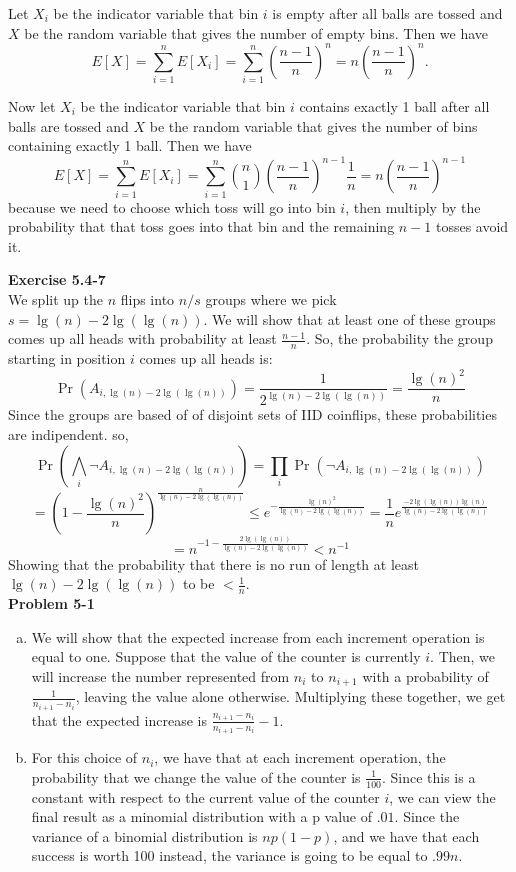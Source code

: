 \documentclass{article}
\begin{document}
Let $X_i$ be the indicator variable that bin $i$ is empty after all balls are tossed and $X$ be the random variable that gives the number of empty bins.  Then we have
\[ E[X] = \sum_{i=1}^n E[X_i] = \sum_{i=1}^n \left(\frac{n-1}{n}\right)^n = n\left(\frac{n-1}{n}\right)^n.\]

Now let $X_i$ be the indicator variable that bin $i$ contains exactly 1 ball after all balls are tossed and $X$ be the random variable that gives the number of bins containing exactly 1 ball.  Then we have
\[ E[X] = \sum_{i=1}^n E[X_i] = \sum_{i=1}^n {n \choose 1}\left(\frac{n-1}{n}\right)^{n-1}\frac{1}{n} = n\left(\frac{n-1}{n}\right)^{n-1} \]
because we need to choose which toss will go into bin $i$, then multiply by the probability that that toss goes into that bin and the remaining $n-1$ tosses avoid it.

\noindent\textbf{Exercise 5.4-7}\\

We split up the $n$ flips into $n/s$ groups where we pick $s = \lg(n) - 2\lg(\lg(n))$. We will show that at least one of these groups comes up all heads with probability at least $\frac{n-1}{n}$. So, the probability the group starting in position $i$ comes up all heads is:
\[
\Pr(A_{i,\lg(n)- 2\lg(\lg(n))}) =\frac{1}{2^{\lg(n)- 2\lg(\lg(n))}} = \frac{\lg(n)^2}{n}
\]
Since the groups are based of of disjoint sets of IID coinflips, these probabilities are indipendent. so, 
\[
\Pr(\bigwedge_{i} \neg A_{i,\lg(n)- 2\lg(\lg(n))}) = \prod_i \Pr(\neg A_{i,\lg(n)- 2\lg(\lg(n))}) \]\[= \left(1 - \frac{\lg(n)^2}{n}\right)^{\frac{n}{\lg(n) - 2\lg(\lg(n))}} \le e^{-\frac{\lg(n)^2}{\lg(n) - 2\lg(\lg(n))}} = \frac{1}{n}e^{\frac{-2\lg(\lg(n))\lg(n)}{\lg(n) - 2\lg(\lg(n))}} 
\]
\[
= n^{-1 - \frac{2\lg(\lg(n))}{\lg(n) - 2\lg(\lg(n))}} < n^{-1}
\]
Showing that the probability that there is no run of length at least $\lg(n) - 2\lg(\lg(n))$ to be $<\frac{1}{n}$.\\


\noindent\textbf{Problem 5-1}\\

\begin{enumerate}[a.]
\item
We will show that the expected increase from each increment operation is equal to one. Suppose that the value of the counter is currently $i$. Then, we will increase the number represented from $n_{i}$ to $n_{i+1}$ with a probability of $\frac{1}{n_{i+1} - n_i}$, leaving the value alone otherwise. Multiplying these together, we get that the expected increase is $\frac{n_{i+1} - n_i}{n_{i+1} - n_i} - 1$.
\item
For this choice of $n_i$, we have that at each increment operation, the probability that we change the value of the counter is $\frac{1}{100}$. Since this is a constant with respect to the current value of the counter $i$, we can view the final result as a minomial distribution with a p value of $.01$. Since the variance of a binomial distribution is $np(1-p)$, and we have that each success is worth 100 instead, the variance is going to be equal to $.99n$.
\end{enumerate}
\end{document}
